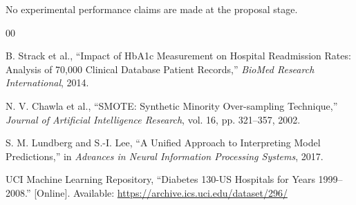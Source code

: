 \documentclass[conference]{IEEEtran}
\begin{document}
No experimental performance claims are made
at the proposal stage.

\begin{thebibliography}{00}

B. Strack et al.,
``Impact of HbA1c Measurement on Hospital
Readmission Rates: Analysis of 70,000
Clinical Database Patient Records,''
\textit{BioMed Research International},
2014.

N. V. Chawla et al.,
``SMOTE: Synthetic Minority
Over-sampling Technique,''
\textit{Journal of Artificial
Intelligence Research},
vol. 16, pp. 321--357, 2002.

S. M. Lundberg and S.-I. Lee,
``A Unified Approach to Interpreting
Model Predictions,''
in \textit{Advances in Neural Information
Processing Systems}, 2017.

UCI Machine Learning Repository,
``Diabetes 130-US Hospitals for Years
1999--2008.''
[Online]. Available:
\url{https://archive.ics.uci.edu/dataset/296/}

\end{thebibliography}
\end{document}
